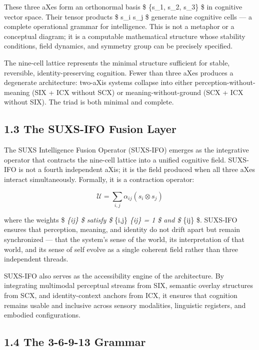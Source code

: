 These three aXes form an orthonormal basis \$ \{s\_1, s\_2, s\_3\} \$ in cognitive vector space. Their tensor products \$ s\_i \otimes s\_j \$ generate nine cognitive cells --- a complete operational grammar for intelligence. This is not a metaphor or a conceptual diagram; it is a computable mathematical structure whose stability conditions, field dynamics, and symmetry group can be precisely specified.

The nine-cell lattice represents the minimal structure sufficient for stable, reversible, identity-preserving cognition. Fewer than three aXes produces a degenerate architecture: two-aXis systems collapse into either perception-without-meaning (SIX + ICX without SCX) or meaning-without-ground (SCX + ICX without SIX). The triad is both minimal and complete.

\subsection{1.3 The SUXS-IFO Fusion Layer}\label{the-suxs-ifo-fusion-layer}

The SUXS Intelligence Fusion Operator (SUXS-IFO) emerges as the integrative operator that contracts the nine-cell lattice into a unified cognitive field. SUXS-IFO is not a fourth independent aXis; it is the field produced when all three aXes interact simultaneously. Formally, it is a contraction operator:

\[
\mathcal{U} = \sum_{i,j} \alpha_{ij}(s_i \otimes s_j)
\]

where the weights \$ \alpha\emph{\{ij\} \$ satisfy \$ \sum}\{i,j\} \alpha\emph{\{ij\} = 1 \$ and \$ \alpha}\{ij\}  \$. SUXS-IFO ensures that perception, meaning, and identity do not drift apart but remain synchronized --- that the system's sense of the world, its interpretation of that world, and its sense of self evolve as a single coherent field rather than three independent threads.

SUXS-IFO also serves as the accessibility engine of the architecture. By integrating multimodal perceptual streams from SIX, semantic overlay structures from SCX, and identity-context anchors from ICX, it ensures that cognition remains usable and inclusive across sensory modalities, linguistic registers, and embodied configurations.

\subsection{1.4 The 3-6-9-13 Grammar}\label{the-3-6-9-13-grammar}

